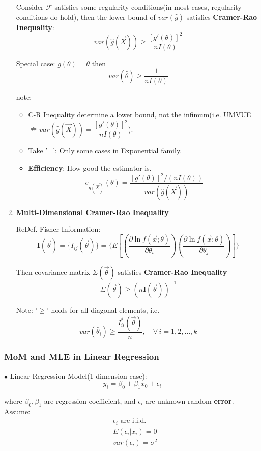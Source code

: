 \documentclass[11pt,a4paper]{ctexart}
\numberwithin{equation}{section}%
\begin{document}
\begin{enumerate}
    Consider $\mathscr{F}$ satisfies some regularity conditions(in most cases, regularity conditions do  hold), then the lower bound of $var(\hat{g})$ satisfies \textbf{Cramer-Rao Inequality}:
    \[
        var(\hat{g}(\vec{X}))\geq\frac{[g'(\theta)]^2}{nI(\theta)}
    \]

    Special case: $g(\theta)=\theta$ then
    \[
        var(\hat{\theta})\geq\frac{1}{nI(\theta)}    
    \]

    note:
    \begin{itemize}
        \item C-R Inequality determine a lower bound, not the infimum(i.e. UMVUE$\nRightarrow var(\hat{g}(\vec{X}))=\dfrac{[g'(\theta)]^2}{nI(\theta)}$).
        \item Take '=': Only some cases in Exponential family.
        \item \textbf{Efficiency}: How good the estimator is.
        \[
            e_{\hat{g}(\vec{X})}(\theta)=   \frac{[g'(\theta)]^2/(nI(\theta))}{var(\hat{g}(\vec{X}))} 
        \] 
    \end{itemize}


\item \textbf{Multi-Dimensional Cramer-Rao Inequality}

    ReDef. Fisher Information:
    \[
        \mathbf{I}(\vec{\theta})=\{I_{ij}(\vec{\theta})\}=\{E\left[\left(\frac{\partial\ln f(\vec{x};\theta)}{\partial\theta_i}\right)\left(\frac{\partial\ln f(\vec{x};\theta)}{\partial\theta_j}\right)\right]\}  
    \]

    Then covariance matrix $\Sigma(\vec{\theta})$ satisfies \textbf{Cramer-Rao Inequality}
    \[
        \Sigma(\vec{\theta})\geq (n\mathbf{I}(\vec{\theta}))^{-1}
    \]

    Note: '$\geq$' holds for all diagonal elements, i.e.
\[
    var(\hat{\theta}_i)\geq \frac{I^*_{ii}(\vec{\theta})}{n},\quad \forall\,i=1,2,\ldots,k  
\]


    
\end{enumerate}

\subsubsection{MoM and MLE in Linear Regression}\label{SubSectionMoM_MLE_LinearRegression}
    $\bullet$ Linear Regression Model(1-dimension case):
    \[
        y_i=\beta_0+\beta_1x_0+\epsilon_i    
    \]

    where $\beta_0,\beta_1$ are regression coefficient, and $\epsilon_i$ are unknown random \textbf{error}. Assume:
    \begin{align*}
        &\epsilon_i\text{ are i.i.d.}\\
        &E(\epsilon_i|x_i)=0\\
        &var(\epsilon_i)=\sigma^2
    \end{align*}
\end{document}
